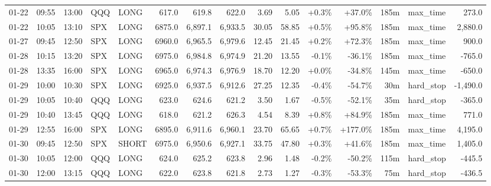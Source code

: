 \documentclass[11pt,a4paper,twoside]{article}
\begin{document}
\begin{landscape}
\begin{center}
\begin{longtable}{>{\color{txtmain}}l l l l l r r r r r r r r >{\color{txtmain}}l r}
01-22 & 09:55 & 13:00 & QQQ & LONG & 617.0 & 619.8 & 622.0 & 3.69 & 5.05 & \textcolor{wingreen}{+0.3\%} & \textcolor{wingreen}{+37.0\%} & 185m & max\_time & \textcolor{wingreen}{273.0} \\
01-22 & 10:05 & 13:10 & SPX & LONG & 6875.0 & 6,897.1 & 6,933.5 & 30.05 & 58.85 & \textcolor{wingreen}{+0.5\%} & \textcolor{wingreen}{+95.8\%} & 185m & max\_time & \textcolor{wingreen}{2,880.0} \\
01-27 & 09:45 & 12:50 & SPX & LONG & 6960.0 & 6,965.5 & 6,979.6 & 12.45 & 21.45 & \textcolor{wingreen}{+0.2\%} & \textcolor{wingreen}{+72.3\%} & 185m & max\_time & \textcolor{wingreen}{900.0} \\
01-28 & 10:15 & 13:20 & SPX & LONG & 6975.0 & 6,984.8 & 6,974.9 & 21.20 & 13.55 & \textcolor{lossred}{-0.1\%} & \textcolor{lossred}{-36.1\%} & 185m & max\_time & \textcolor{lossred}{-765.0} \\
01-28 & 13:35 & 16:00 & SPX & LONG & 6965.0 & 6,974.3 & 6,976.9 & 18.70 & 12.20 & \textcolor{wingreen}{+0.0\%} & \textcolor{lossred}{-34.8\%} & 145m & max\_time & \textcolor{lossred}{-650.0} \\
01-29 & 10:00 & 10:30 & SPX & LONG & 6925.0 & 6,937.5 & 6,912.6 & 27.25 & 12.35 & \textcolor{lossred}{-0.4\%} & \textcolor{lossred}{-54.7\%} & 30m & hard\_stop & \textcolor{lossred}{-1,490.0} \\
01-29 & 10:05 & 10:40 & QQQ & LONG & 623.0 & 624.6 & 621.2 & 3.50 & 1.67 & \textcolor{lossred}{-0.5\%} & \textcolor{lossred}{-52.1\%} & 35m & hard\_stop & \textcolor{lossred}{-365.0} \\
01-29 & 10:40 & 13:45 & QQQ & LONG & 618.0 & 621.2 & 626.3 & 4.54 & 8.39 & \textcolor{wingreen}{+0.8\%} & \textcolor{wingreen}{+84.9\%} & 185m & max\_time & \textcolor{wingreen}{771.0} \\
01-29 & 12:55 & 16:00 & SPX & LONG & 6895.0 & 6,911.6 & 6,960.1 & 23.70 & 65.65 & \textcolor{wingreen}{+0.7\%} & \textcolor{wingreen}{+177.0\%} & 185m & max\_time & \textcolor{wingreen}{4,195.0} \\
01-30 & 09:45 & 12:50 & SPX & SHORT & 6975.0 & 6,950.6 & 6,927.1 & 33.75 & 47.80 & \textcolor{wingreen}{+0.3\%} & \textcolor{wingreen}{+41.6\%} & 185m & max\_time & \textcolor{wingreen}{1,405.0} \\
01-30 & 10:05 & 12:00 & QQQ & LONG & 624.0 & 625.2 & 623.8 & 2.96 & 1.48 & \textcolor{lossred}{-0.2\%} & \textcolor{lossred}{-50.2\%} & 115m & hard\_stop & \textcolor{lossred}{-445.5} \\
01-30 & 12:00 & 13:15 & QQQ & LONG & 622.0 & 623.8 & 621.8 & 2.73 & 1.27 & \textcolor{lossred}{-0.3\%} & \textcolor{lossred}{-53.3\%} & 75m & hard\_stop & \textcolor{lossred}{-436.5} \\

\end{longtable}
\end{center}
\end{landscape}
\end{document}
